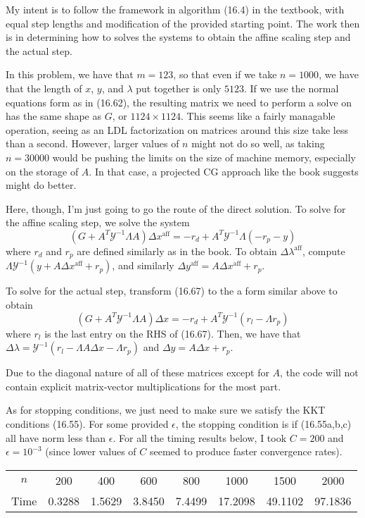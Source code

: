 \documentclass{article}
\newcommand{\ep}{\epsilon}
\begin{document}
My intent is to follow the framework in algorithm (16.4) in the textbook, with equal step lengths and modification of the provided starting point. The work then is in determining how to solves the systems to obtain the affine scaling step and the actual step. 

In this problem, we have that $m=123$, so that even if we take $n=1000$, we have that the length of $x$, $y$, and $\lambda$ put together is only $5123$. If we use the normal equations form as in (16.62), the resulting matrix we need to perform a solve on has the same shape as $G$, or $1124\times1124$. This seems like a fairly managable operation, seeing as an LDL factorization on matrices around this size take less than a second. However, larger values of $n$ might not do so well, as taking $n=30000$ would be pushing the limits on the size of machine memory, especially on the storage of $A$. In that case, a projected CG approach like the book suggests might do better.

Here, though, I'm just going to go the route of the direct solution. To solve for the affine scaling step, we solve the system
\[(G+A^T\mathscr{Y}^{-1}\Lambda A)\Delta x^\text{aff}=-r_d+A^T\mathscr{Y}^{-1}\Lambda(-r_p-y)\]
where $r_d$ and $r_p$ are defined similarly as in the book. To obtain $\Delta\lambda^\text{aff}$, compute $\Lambda\mathscr{Y}^{-1}(y+A\Delta x^\text{aff}+r_p)$, and similarly $\Delta y^\text{aff}=A\Delta x^\text{aff}+r_p$. 

To solve for the actual step, transform (16.67) to the a form similar above to obtain
\[(G+A^T\mathscr{Y}^{-1}\Lambda A)\Delta x=-r_d+A^T\mathscr{Y}^{-1}(r_l-\Lambda r_p)\]
where $r_l$ is the last entry on the RHS of (16.67). Then, we have that $\Delta\lambda=\mathscr{Y}^{-1}(r_l-\Lambda A\Delta x-\Lambda r_p)$ and $\Delta y=A\Delta x+r_p$.

Due to the diagonal nature of all of these matrices except for $A$, the code will not contain explicit matrix-vector multiplications for the most part.

As for stopping conditions, we just need to make sure we satisfy the KKT conditions (16.55). For some provided $\ep$, the stopping condition is if (16.55a,b,c) all have norm less than $\ep$.
For all the timing results below, I took $C=200$ and $\ep=10^{-3}$ (since lower values of $C$ seemed to produce faster convergence rates). 

\begin{tabular}{c|ccccccc}
    $n$&200&400&600&800&1000&1500&2000\\
    Time&0.3288&1.5629&3.8450&7.4499&17.2098&49.1102&97.1836\\
\end{tabular}
\end{document}
